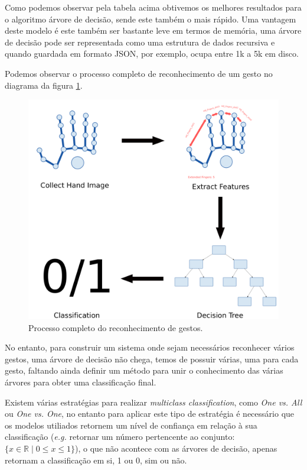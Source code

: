 \documentclass{TTUPhD}
\begin{document}
Como podemos observar pela tabela acima obtivemos os melhores resultados para o algoritmo árvore de decisão, sende este também o mais rápido.
Uma vantagem deste modelo é este também ser bastante leve em termos de memória, uma árvore de decisão pode ser representada como uma estrutura de dados
recursiva e quando guardada em formato JSON, por exemplo, ocupa entre 1k a 5k em disco.

Podemos observar o processo completo de reconhecimento de um gesto no diagrama da figura \ref{fig:ml_model}.

\begin{figure}[h!]
    \center
    \includegraphics[scale=0.3]{./img/ml_model.png}
    \caption{Processo completo do reconhecimento de gestos.}
    \label{fig:ml_model}
\end{figure}

No entanto, para construir um sistema onde sejam necessários reconhecer vários gestos, uma árvore de decisão não chega, temos de possuir várias, uma para
cada gesto, faltando ainda definir um método para unir o conhecimento das várias árvores para obter uma classificação final.

Existem várias estratégias para realizar \textit{multiclass classification}, como \textit{One vs. All} ou \textit{One vs. One}, no entanto para aplicar este tipo
de estratégia é necessário que os modelos utiliados retornem um nível de confiança em relação à sua classificação (\textit{e.g.} retornar um número pertencente ao conjunto: $\{x \in \mathbb{R} \mid 0 \le x \le 1\}$), o que não acontece com as árvores de decisão,
apenas retornam a classificação em si, 1 ou 0, sim ou não.
\end{document}
